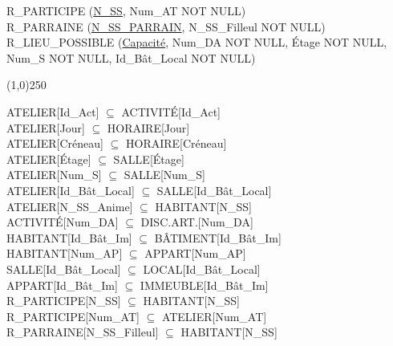 \documentclass[a4paper,10.5pt]{report}
\begin{document}
	R\_PARTICIPE (\underline{N\_SS}, Num\_AT NOT NULL) \\

	R\_PARRAINE (\underline{N\_SS\_PARRAIN}, N\_SS\_Filleul NOT NULL) \\

	R\_LIEU\_POSSIBLE (\underline{Capacité}, Num\_DA NOT NULL, Étage NOT NULL, Num\_S NOT NULL, Id\_Bât\_Local NOT NULL)

	\begin{center}
	\line(1,0){250}
	\end{center}

	ATELIER[Id\_Act] $\subseteq$ ACTIVITÉ[Id\_Act] \\

	ATELIER[Jour] $\subseteq$ HORAIRE[Jour] \\

	ATELIER[Créneau] $\subseteq$ HORAIRE[Créneau] \\

	ATELIER[Étage] $\subseteq$ SALLE[Étage] \\

	ATELIER[Num\_S] $\subseteq$ SALLE[Num\_S] \\

	ATELIER[Id\_Bât\_Local] $\subseteq$ SALLE[Id\_Bât\_Local] \\

	ATELIER[N\_SS\_Anime] $\subseteq$ HABITANT[N\_SS] \\

	ACTIVITÉ[Num\_DA] $\subseteq$ DISC.ART.[Num\_DA] \\

	HABITANT[Id\_Bât\_Im] $\subseteq$ BÂTIMENT[Id\_Bât\_Im] \\

	HABITANT[Num\_AP] $\subseteq$ APPART[Num\_AP] \\

	SALLE[Id\_Bât\_Local] $\subseteq$ LOCAL[Id\_Bât\_Local] \\

	APPART[Id\_Bât\_Im] $\subseteq$ IMMEUBLE[Id\_Bât\_Im] \\

	R\_PARTICIPE[N\_SS]  $\subseteq$ HABITANT[N\_SS] \\

	R\_PARTICIPE[Num\_AT] $\subseteq$ ATELIER[Num\_AT] \\

	R\_PARRAINE[N\_SS\_Filleul] $\subseteq$ HABITANT[N\_SS] \\
\end{document}
